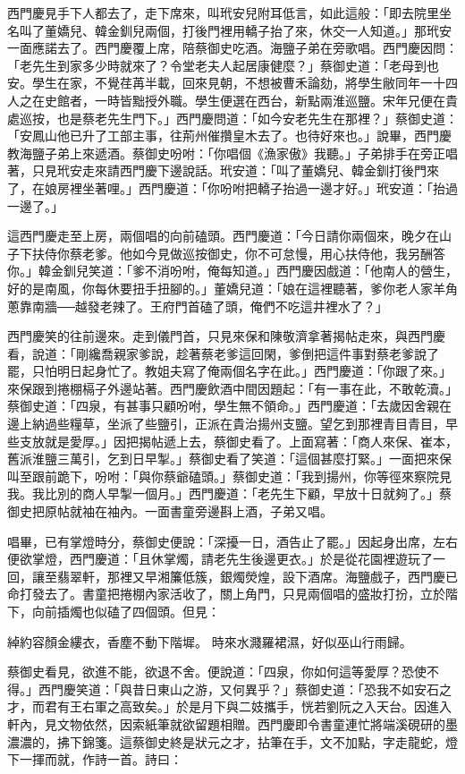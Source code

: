 \begin{showcontents}{}
西門慶見手下人都去了，走下席來，叫玳安兒附耳低言，如此這般：「即去院里坐名叫了董嬌兒、韓金釧兒兩個，打後門裡用轎子抬了來，休交一人知道。」那玳安一面應諾去了。西門慶覆上席，陪蔡御史吃酒。海鹽子弟在旁歌唱。西門慶因問：「老先生到家多少時就來了？令堂老夫人起居康健麼？」蔡御史道：「老母到也安。學生在家，不覺荏苒半載，回來見朝，不想被曹禾論劾，將學生敝同年一十四人之在史館者，一時皆黜授外職。學生便選在西台，新點兩淮巡鹽。宋年兄便在貴處巡按，也是蔡老先生門下。」西門慶問道：「如今安老先生在那裡？」蔡御史道：「安鳳山他已升了工部主事，往荊州催攢皇木去了。也待好來也。」說畢，西門慶教海鹽子弟上來遞酒。蔡御史吩咐：「你唱個《漁家傲》我聽。」子弟排手在旁正唱著，只見玳安走來請西門慶下邊說話。玳安道：「叫了董嬌兒、韓金釧打後門來了，在娘房裡坐著哩。」西門慶道：「你吩咐把轎子抬過一邊才好。」玳安道：「抬過一邊了。」

這西門慶走至上房，兩個唱的向前磕頭。西門慶道：「今日請你兩個來，晚夕在山子下扶侍你蔡老爹。他如今見做巡按御史，你不可怠慢，用心扶侍他，我另酬答你。」韓金釧兒笑道：「爹不消吩咐，俺每知道。」西門慶因戲道：「他南人的營生，好的是南風，你每休要扭手扭腳的。」董嬌兒道：「娘在這裡聽著，爹你老人家羊角蔥靠南牆──越發老辣了。王府門首磕了頭，俺們不吃這井裡水了？」

西門慶笑的往前邊來。走到儀門首，只見來保和陳敬濟拿著揭帖走來，與西門慶看，說道：「剛纔喬親家爹說，趁著蔡老爹這回閑，爹倒把這件事對蔡老爹說了罷，只怕明日起身忙了。教姐夫寫了俺兩個名字在此。」西門慶道：「你跟了來。」來保跟到捲棚槅子外邊站著。西門慶飲酒中間因題起：「有一事在此，不敢乾瀆。」 蔡御史道：「四泉，有甚事只顧吩咐，學生無不領命。」西門慶道：「去歲因舍親在邊上納過些糧草，坐派了些鹽引，正派在貴治揚州支鹽。望乞到那裡青目青目，早些支放就是愛厚。」因把揭帖遞上去，蔡御史看了。上面寫著：「商人來保、崔本，舊派淮鹽三萬引，乞到日早掣。」蔡御史看了笑道：「這個甚麼打緊。」一面把來保叫至跟前跪下，吩咐：「與你蔡爺磕頭。」蔡御史道：「我到揚州，你等徑來察院見我。我比別的商人早掣一個月。」西門慶道：「老先生下顧，早放十日就夠了。」蔡御史把原帖就袖在袖內。一面書童旁邊斟上酒，子弟又唱。

唱畢，已有掌燈時分，蔡御史便說：「深擾一日，酒告止了罷。」因起身出席，左右便欲掌燈，西門慶道：「且休掌燭，請老先生後邊更衣。」於是從花園裡遊玩了一回，讓至翡翠軒，那裡又早湘簾低簇，銀燭熒煌，設下酒席。海鹽戲子，西門慶已命打發去了。書童把捲棚內家活收了，關上角門，只見兩個唱的盛妝打扮，立於階下，向前插燭也似磕了四個頭。但見：

綽約容顏金縷衣，香塵不動下階墀。
時來水濺羅裙濕，好似巫山行雨歸。

蔡御史看見，欲進不能，欲退不舍。便說道：「四泉，你如何這等愛厚？恐使不得。」西門慶笑道：「與昔日東山之游，又何異乎？」蔡御史道：「恐我不如安石之才，而君有王右軍之高致矣。」於是月下與二妓攜手，恍若劉阮之入天台。因進入軒內，見文物依然，因索紙筆就欲留題相贈。西門慶即令書童連忙將端溪硯研的墨濃濃的，拂下錦箋。這蔡御史終是狀元之才，拈筆在手，文不加點，字走龍蛇，燈下一揮而就，作詩一首。詩曰：


\end{showcontents}
